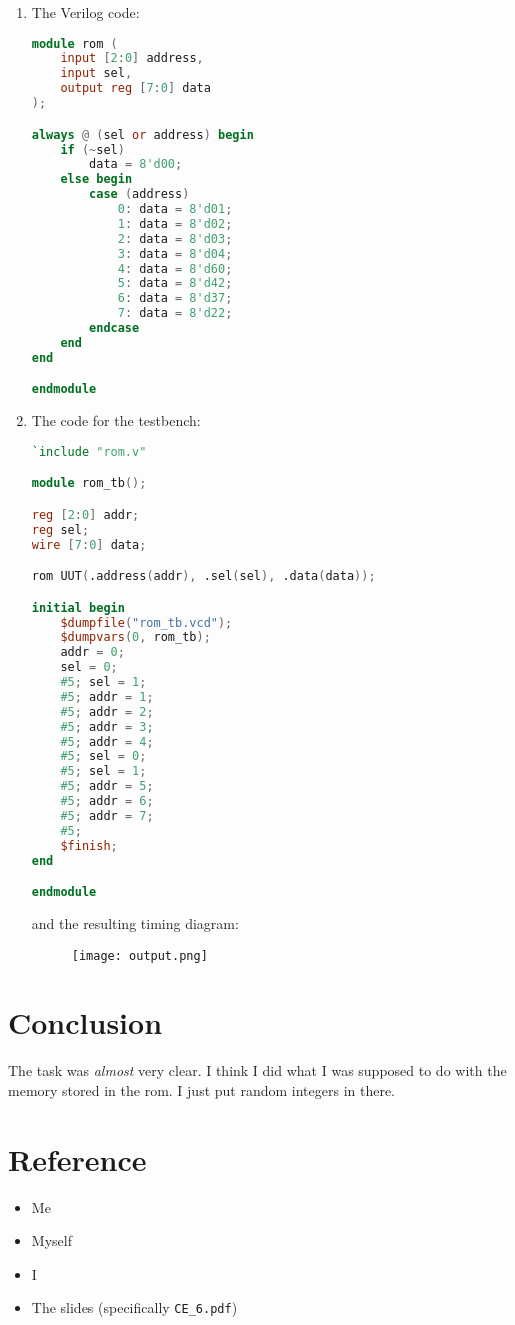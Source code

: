 \documentclass{article}
\begin{document}
    \begin{enumerate}
        \item {
            The Verilog code:
            
            \begin{lstlisting}[language=verilog]
module rom (
    input [2:0] address, 
    input sel,
    output reg [7:0] data
);

always @ (sel or address) begin
    if (~sel)
        data = 8'd00;
    else begin
        case (address)
            0: data = 8'd01;
            1: data = 8'd02;
            2: data = 8'd03;
            3: data = 8'd04;
            4: data = 8'd60;
            5: data = 8'd42;
            6: data = 8'd37;
            7: data = 8'd22;
        endcase
    end
end

endmodule\end{lstlisting}
        }
        \item{
            The code for the testbench:
            \begin{lstlisting}[language=verilog]
`include "rom.v"

module rom_tb();

reg [2:0] addr;
reg sel;
wire [7:0] data;

rom UUT(.address(addr), .sel(sel), .data(data));

initial begin
    $dumpfile("rom_tb.vcd");
    $dumpvars(0, rom_tb);
    addr = 0;
    sel = 0;
    #5; sel = 1;
    #5; addr = 1;
    #5; addr = 2;
    #5; addr = 3;
    #5; addr = 4;
    #5; sel = 0;
    #5; sel = 1;
    #5; addr = 5;
    #5; addr = 6;
    #5; addr = 7;
    #5;
    $finish;
end

endmodule\end{lstlisting}

            and the resulting timing diagram:

            \begin{figure}[h]
                \texttt{[image: output.png]}
            \end{figure}
        }
    \end{enumerate}

    \section*{Conclusion}
    
    The task was \textit{almost} very clear. I think I did what I was supposed to do with the memory stored in the rom. I just put random integers in there.

    \section*{Reference}
    
    \begin{itemize}
        \item Me
        \item Myself
        \item I
        \item The slides (specifically \verb|CE_6.pdf|)
    \end{itemize}
\end{document}
